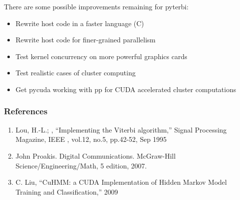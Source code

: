 \documentclass{beamer}
\begin{document}
   \begin{frame}
        There are some possible improvements remaining for pyterbi:
        \begin{itemize}
            \item Rewrite host code in a faster language (C)
            \item Rewrite host code for finer-grained parallelism
            \item Test kernel concurrency on more powerful graphics cards 
            \item Test realistic cases of cluster computing
            \item Get pycuda working with pp for CUDA accelerated cluster computations
        \end{itemize}
    \end{frame}

    \begin{frame}
        \frametitle{References}
        \begin{enumerate}
            \item Lou, H.-L.; , ``Implementing the Viterbi algorithm,'' Signal Processing Magazine, IEEE , vol.12, no.5, pp.42-52, Sep 1995
            \item John Proakis. Digital Communications. McGraw-Hill Science/Engineering/Math, 5 edition, 2007.
            \item C. Liu, ``CuHMM: a CUDA Implementation of Hidden Markov Model Training and Classification,'' 2009 
        \end{enumerate}
    \end{frame}
\end{document}
